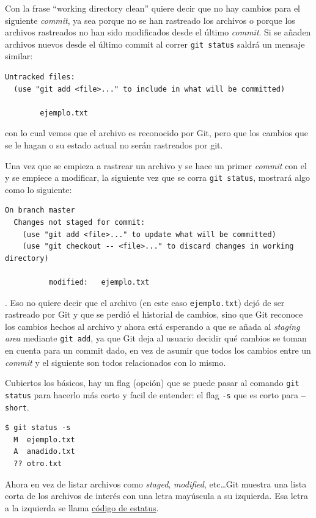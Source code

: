 \documentclass[spanish, 12pt, a4paper]{article}
\begin{document}
Con la frase ``working directory clean'' quiere decir que no hay cambios para el siguiente \textit{commit}, ya sea porque no se han rastreado los archivos o porque los archivos rastreados no han sido modificados desde el último \textit{commit}.
Si se añaden archivos nuevos desde el último commit al correr \texttt{git status} saldrá un mensaje similar:
\begin{lstlisting}
Untracked files:
  (use "git add <file>..." to include in what will be committed)

        ejemplo.txt
\end{lstlisting}
con lo cual vemos que el archivo es reconocido por Git, pero que los cambios que se le hagan o su estado actual no serán rastreados por git.

Una vez que se empieza a rastrear un archivo y se hace un primer \textit{commit} con el y se empiece a modificar, la siguiente vez que se corra \texttt{git status}, mostrará algo como lo siguiente: 
\begin{lstlisting}
On branch master
  Changes not staged for commit:
    (use "git add <file>..." to update what will be committed)
    (use "git checkout -- <file>..." to discard changes in working directory)
  
          modified:   ejemplo.txt
\end{lstlisting}. 
Eso no quiere decir que el archivo (en este caso \texttt{ejemplo.txt}) dejó de ser rastreado por Git y que se perdió el historial de cambios, sino que Git reconoce los cambios hechos al archivo y ahora está esperando a que se añada al \textit{staging area} mediante \texttt{git add}, ya que Git deja al usuario decidir qué cambios se toman en cuenta para un commit dado, en vez de asumir que todos los cambios entre un \textit{commit} y el siguiente son todos relacionados con lo mismo.

Cubiertos los básicos, hay un flag (opción) que se puede pasar al comando \texttt{git status} para hacerlo más corto y facil de entender: el flag \texttt{-s} que es corto para \texttt{--short}.
\begin{lstlisting}
$ git status -s
  M  ejemplo.txt
  A  anadido.txt
  ?? otro.txt
\end{lstlisting}

Ahora en vez de listar archivos como \textit{staged}, \textit{modified}, etc\dots Git muestra una lista corta de los archivos de interés con una letra mayúscula a su izquierda.
Esa letra a la izquierda se llama \underline{código de estatus}.
\end{document}
